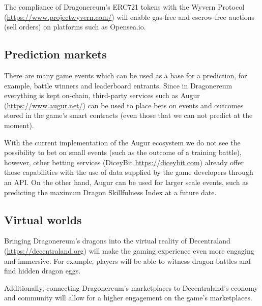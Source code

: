 \documentclass[12pt]{article}
\begin{document}
The compliance of Dragonereum’s ERC721 tokens with the Wyvern Protocol (\url{https://www.projectwyvern.com/}) will enable gas-free and escrow-free auctions (sell orders) on platforms such as Opensea.io.\par


\vspace{\baselineskip}
\subsection{Prediction markets}\label{Prediction markets}\par

There are many game events which can be used as a base for a prediction, for example, battle winners and leaderboard entrants. Since in Dragonereum everything is kept on-chain, third-party services such as Augur (\url{https://www.augur.net/}) can be used to place bets on events and outcomes stored in the game’s smart contracts (even those that we can not predict at the moment).\par

With the current implementation of the Augur ecosystem we do not see the possibility to bet on small events (such as the outcome of a training battle), however, other betting services (DiceyBit \url{https://diceybit.com}) already offer those capabilities with the use of data supplied by the game developers through an API. On the other hand, Augur can be used for larger scale events, such as predicting the maximum Dragon Skillfulness Index at a future date.\par


\vspace{\baselineskip}
 \subsection{Virtual worlds}\label{Virtual worlds} \par

Bringing Dragonereum’s dragons into the virtual reality of Decentraland (\url{https://decentraland.org}) will make the gaming experience even more engaging and immersive. For example, players will be able to witness dragon battles and find hidden dragon eggs. \par

Additionally, connecting Dragonereum’s marketplaces to Decentraland’s economy and community will allow for a higher engagement on the game’s marketplaces.\par
\end{document}
